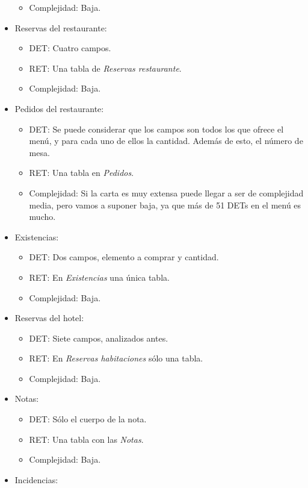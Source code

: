 \documentclass[spanish,a4paper,11pt, twoside]{report}	%
\begin{document}
\begin{itemize}
\begin{itemize}
			\item{Complejidad:} Baja.
		\end{itemize}
		\item{Reservas del restaurante:} 
		\begin{itemize}
 			\item{DET:} Cuatro campos.
			\item{RET:} Una tabla de \textit{Reservas restaurante}.
			\item{Complejidad:} Baja.
		\end{itemize}
		\item{Pedidos del restaurante:} 
		\begin{itemize}
 			\item{DET:} Se puede considerar que los campos son todos los que ofrece el menú, y para cada uno de ellos la cantidad. Además de esto, el número de mesa.
			\item{RET:} Una tabla en \textit{Pedidos}.
			\item{Complejidad:} Si la carta es muy extensa puede llegar a ser de complejidad media, pero vamos a suponer baja, ya que más de 51 DETs en el menú es mucho.
		\end{itemize}
		\item{Existencias:} 
		\begin{itemize}
 			\item{DET:} Dos campos, elemento a comprar y cantidad.
			\item{RET:} En \textit{Existencias} una única tabla.
			\item{Complejidad:} Baja.
		\end{itemize}
		\item{Reservas del hotel:} 
		\begin{itemize}
 			\item{DET:} Siete campos, analizados antes.
			\item{RET:} En \textit{Reservas habitaciones} sólo una tabla.
			\item{Complejidad:} Baja.
		\end{itemize}
		\item{Notas:} 
		\begin{itemize}
 			\item{DET:} Sólo el cuerpo de la nota.
			\item{RET:} Una tabla con las \textit{Notas}.
			\item{Complejidad:} Baja.
		\end{itemize}
		\item{Incidencias:} 
		\begin{itemize}

\end{itemize}
\end{itemize}
\end{document}
